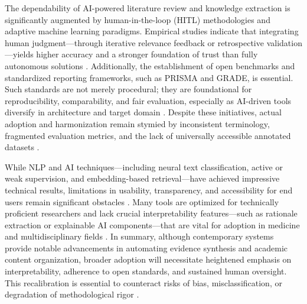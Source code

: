 \documentclass[sigconf]{acmart}
\begin{document}
The dependability of AI-powered literature review and knowledge extraction is significantly augmented by human-in-the-loop (HITL) methodologies and adaptive machine learning paradigms. Empirical studies indicate that integrating human judgment—through iterative relevance feedback or retrospective validation—yields higher accuracy and a stronger foundation of trust than fully autonomous solutions \cite{ref80,ref86,ref88,ref89,ref91,ref94,ref98,ref108}. Additionally, the establishment of open benchmarks and standardized reporting frameworks, such as PRISMA and GRADE, is essential. Such standards are not merely procedural; they are foundational for reproducibility, comparability, and fair evaluation, especially as AI-driven tools diversify in architecture and target domain \cite{ref34,ref78,ref80,ref102,ref104}. Despite these initiatives, actual adoption and harmonization remain stymied by inconsistent terminology, fragmented evaluation metrics, and the lack of universally accessible annotated datasets \cite{ref86,ref80,ref98,ref104}.

While NLP and AI techniques—including neural text classification, active or weak supervision, and embedding-based retrieval—have achieved impressive technical results, limitations in usability, transparency, and accessibility for end users remain significant obstacles \cite{ref46,ref38,ref49,ref51,ref86,ref108}. Many tools are optimized for technically proficient researchers and lack crucial interpretability features—such as rationale extraction or explainable AI components—that are vital for adoption in medicine and multidisciplinary fields \cite{ref47,ref49,ref94,ref96}. In summary, although contemporary systems provide notable advancements in automating evidence synthesis and academic content organization, broader adoption will necessitate heightened emphasis on interpretability, adherence to open standards, and sustained human oversight. This recalibration is essential to counteract risks of bias, misclassification, or degradation of methodological rigor \cite{ref35,ref38,ref46,ref51,ref94,ref98,ref102,ref111}.
\end{document}
